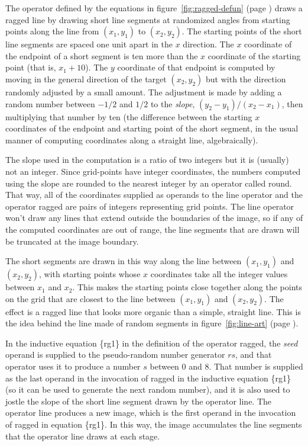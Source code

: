 The operator defined by the equations in
figure~\ref{fig:ragged-defun} (page \pageref{fig:ragged-defun})
draws a ragged line
by drawing short line segments at randomized angles
from starting points along the line from $(x_1,y_1)$ to $(x_2,y_2)$.
The starting points of the short line segments are
spaced one unit apart in the $x$ direction.
The $x$ coordinate of the endpoint of a short segment
is ten more than the $x$ coordinate of the starting point
(that is, $x_1 + 10$).
The $y$ coordinate of that endpoint is computed
by moving in the general direction of the target
$(x_2,y_2)$ but with the direction
randomly adjusted by a small amount.
The adjustment is made by adding a random number between
$-1/2$ and $1/2$ to the \emph{slope},
$(y_2 - y_1)/(x_2 - x_1)$, then multiplying that
number by ten (the difference between the
starting $x$ coordinates of the endpoint
and starting point of the short segment,
in the usual manner of computing coordinates
along a straight line, algebraically).

The slope used in the computation is a ratio of
two integers but it is (usually) not an integer.
Since grid-points have integer coordinates,
the numbers computed using the slope
are rounded to the nearest integer by
an operator called \textsf{round}. That way,
all of the coordinates supplied as
operands to the \textsf{line} operator
and the operator \textsf{ragged} are pairs of
integers representing grid points.
The \textsf{line} operator won't draw any lines
that extend outside the boundaries of
the image, so if any of the computed
coordinates are out of range,
the line segments that are drawn will
be truncated at the image boundary.

The short segments are drawn in this way along
the line between $(x_1,y_1)$ and $(x_2,y_2)$,
with starting points whose $x$ coordinates
take all the integer values between $x_1$ and $x_2$.
This makes the starting points close together along
the points on the grid that are closest to the
line between $(x_1,y_1)$ and $(x_2,y_2)$.
The effect is a ragged line that looks more organic
than a simple, straight line.
This is the idea behind the line made of random segments
in figure~\ref{fig:line-art} (page \pageref{fig:line-art}).

In the inductive equation \{rg1\} in the definition of the operator \textsf{ragged},
the \emph{seed} operand is supplied to the pseudo-random
number generator $rs$, and that operator uses it to produce
a number $s$ between 0 and 8. That number is supplied as the last
operand in the invocation of \textsf{ragged} in the inductive equation \{rg1\}
(so it can be used to generate the next random number),
and it is also used to jostle
the slope of the short line segment drawn by the operator \textsf{line}.
The operator \textsf{line} produces a new image,
which is the first operand in the invocation of \textsf{ragged} in equation \{rg1\}.
In this way, the image accumulates the line segments that the operator \textsf{line}
draws at each stage.


